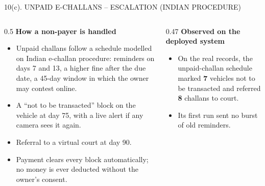 \documentclass[aspectratio=169,10pt,t]{beamer}
\newcommand{\hd}[1]{{\color{dsblue}\textbf{#1}}}          %
\begin{document}
\begin{frame}{10(c). UNPAID E-CHALLANS -- ESCALATION (INDIAN PROCEDURE)}
\centering
{}
\vspace{0.6em}
\begin{columns}[T,onlytextwidth]
\begin{column}{0.5\textwidth}
\hd{\small How a non-payer is handled}
\scriptsize
\begin{itemize}\setlength{\itemsep}{0.15em}
  \item Unpaid challans follow a schedule modelled on Indian e-challan procedure: reminders on days 7 and 13, a
        higher fine after the due date, a 45-day window in which the owner may contest online.
  \item A ``not to be transacted'' block on the vehicle at day 75, with a live alert if any camera sees it again.
  \item Referral to a virtual court at day 90.
  \item Payment clears every block automatically; no money is ever deducted without the owner's consent.
\end{itemize}
\end{column}
\begin{column}{0.47\textwidth}
\hd{\small Observed on the deployed system}
\scriptsize
\begin{itemize}\setlength{\itemsep}{0.15em}
  \item On the real records, the unpaid-challan schedule marked \textbf{7} vehicles not to be transacted and
        referred \textbf{8} challans to court.
  \item Its first run sent no burst of old reminders.
\end{itemize}
\end{column}
\end{columns}
\end{frame}
\end{document}
